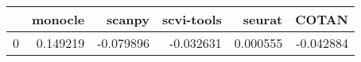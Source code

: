 \begin{tabular}{lrrrrr}
\toprule
 & monocle & scanpy & scvi-tools & seurat & COTAN \\
\midrule
0 & 0.149219 & -0.079896 & -0.032631 & 0.000555 & -0.042884 \\
\bottomrule
\end{tabular}
